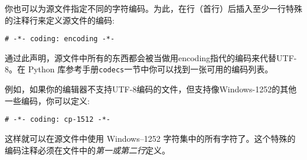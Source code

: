 你也可以为源文件指定不同的字符编码。为此，在行（首行）后插入至少一行特殊的注释行来定义源文件的编码:
\begin{lstlisting}
# -*- coding: encoding -*-
\end{lstlisting}

通过此声明，源文件中所有的东西都会被当做用encoding指代的编码来代替UTF-8。在 Python 库参考手册\texttt{codecs}一节中你可以找到一张可用的编码列表。

例如，如果你的编辑器不支持UTF-8编码的文件，但支持像Windows-1252的其他一些编码，你可以定义:
\begin{lstlisting}
# -*- coding: cp-1512 -*-
\end{lstlisting}

这样就可以在源文件中使用 Windows--1252 字符集中的所有字符了。这个特殊的编码注释必须在文件中的\emph{第一或第二行}定义。